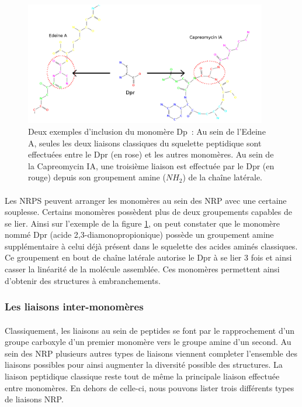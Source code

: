\documentclass[12pt,french,twoside]{report}
\begin{document}
\begin{figure}[h!]
  \begin{center}
    \includegraphics[width=400px]{Figures/bio/Intro/Dpr/2-3_liaisons.png}
    \caption{\label{DPR_incl}Deux exemples d'inclusion du monomère Dp~:
    Au sein de l'Edeine A, seules les deux liaisons classiques du squelette peptidique sont effectuées entre le Dpr (en rose) et les autres monomères.
    Au sein de la Capreomycin IA, une troisième liaison est effectuée par le Dpr (en rouge) depuis son groupement amine ($NH_2$) de la chaîne latérale.}
  \end{center}
\end{figure}

\paragraph{}Les NRPS peuvent arranger les monomères au sein des NRP avec une certaine souplesse.
Certains monomères possèdent plus de deux groupements capables de se lier.
Ainsi sur l'exemple de la figure \ref{DPR_incl}, on peut constater que le monomère nommé Dpr (acide 2,3-diamonopropionique) possède un groupement amine supplémentaire à celui déjà présent dans le squelette des acides aminés classiques.
Ce groupement en bout de chaîne latérale autorise le Dpr à se lier 3 fois et ainsi casser la linéarité de la molécule assemblée.
Ces monomères permettent ainsi d'obtenir des structures à embranchements.


\subsubsection{Les liaisons inter-monomères}

\paragraph{}Classiquement, les liaisons au sein de peptides se font par le rapprochement d'un groupe carboxyle d'un premier monomère vers le groupe amine d'un second.
Au sein des NRP plusieurs autres types de liaisons viennent completer l'ensemble des liaisons possibles pour ainsi augmenter la diversité possible des structures.
La liaison peptidique classique reste tout de même la principale liaison effectuée entre monomères.
En dehors de celle-ci, nous pouvons lister trois différents types de liaisons NRP.
\end{document}
